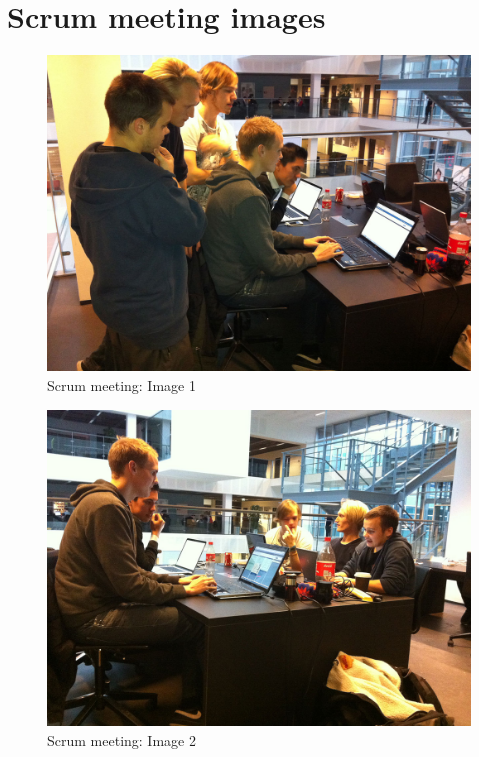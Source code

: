 \section{Scrum meeting images}
\label{sec:scrum-meeting-images}

\begin{figure}[htb]
	\centering
	\includegraphics[width=1\textwidth]{Appendices/graphics/scrum_pic1.jpg}
	\caption{Scrum meeting: Image 1}
	\label{fig:scrum-image-1}
\end{figure}

\begin{figure}[htb]
	\centering
	\includegraphics[width=1\textwidth]{Appendices/graphics/scrum_pic2.jpg}
	\caption{Scrum meeting: Image 2}
	\label{fig:scrum-image-2}
\end{figure}